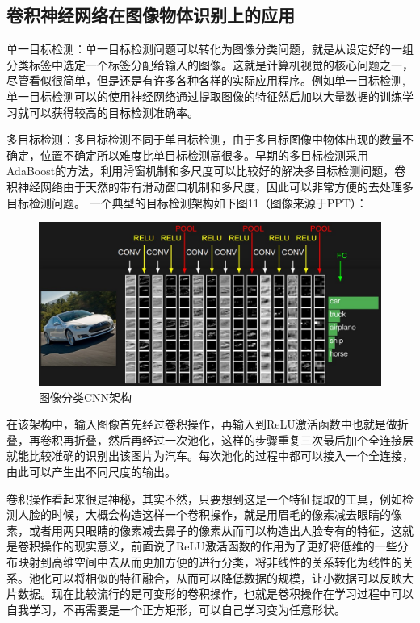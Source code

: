 \documentclass{article} %
\begin{document}
\begin{CJK*}{UTF8}{gkai}
\subsection{卷积神经网络在图像物体识别上的应用}
单一目标检测：单一目标检测问题可以转化为图像分类问题，就是从设定好的一组分类标签中选定一个标签分配给输入的图像。这就是计算机视觉的核心问题之一，尽管看似很简单，但是还是有许多各种各样的实际应用程序。例如单一目标检测,单一目标检测可以的使用神经网络通过提取图像的特征然后加以大量数据的训练学习就可以获得较高的目标检测准确率。

多目标检测：多目标检测不同于单目标检测，由于多目标图像中物体出现的数量不确定，位置不确定所以难度比单目标检测高很多。早期的多目标检测采用AdaBoost的方法，利用滑窗机制和多尺度可以比较好的解决多目标检测问题，卷积神经网络由于天然的带有滑动窗口机制和多尺度，因此可以非常方便的去处理多目标检测问题。
一个典型的目标检测架构如下图11（图像来源于PPT）：

\begin{figure}[h]
\begin{center}

\includegraphics[width=5.5in]{11.png}

\end{center}
\caption{图像分类CNN架构}
\end{figure}

在该架构中，输入图像首先经过卷积操作，再输入到ReLU激活函数中也就是做折叠，再卷积再折叠，然后再经过一次池化，这样的步骤重复三次最后加个全连接层就能比较准确的识别出该图片为汽车。每次池化的过程中都可以接入一个全连接，由此可以产生出不同尺度的输出。

卷积操作看起来很是神秘，其实不然，只要想到这是一个特征提取的工具，例如检测人脸的时候，大概会构造这样一个卷积操作，就是用眉毛的像素减去眼睛的像素，或者用两只眼睛的像素减去鼻子的像素从而可以构造出人脸专有的特征，这就是卷积操作的现实意义，前面说了ReLU激活函数的作用为了更好将低维的一些分布映射到高维空间中去从而更加方便的进行分类，将非线性的关系转化为线性的关系。池化可以将相似的特征融合，从而可以降低数据的规模，让小数据可以反映大片数据。现在比较流行的是可变形的卷积操作，也就是卷积操作在学习过程中可以自我学习，不再需要是一个正方矩形，可以自己学习变为任意形状。



\end{CJK*}
\end{document}
